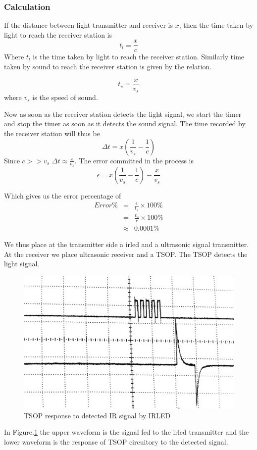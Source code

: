 \subsubsection{Calculation}
If the distance between light transmitter and receiver is $x$, then the time taken by light to reach the receiver station is 
\begin{equation}
	t_l = \frac{x}{c}
\end{equation}
Where $t_l$ is the time taken by light to reach the receiver station. Similarly time taken by sound to reach the receiver station is given by the relation.

\begin{equation}
	t_s = \frac{x}{v_s}
\end{equation}
where $v_s$ is the speed of sound.

Now as soon as the receiver station detects the light signal, we start the timer and stop the timer as soon as it detects the sound signal.
The time recorded by the receiver station will thus be 
\begin{equation} \label{eq:deltaT}
	\Delta t = x\left( \frac{1}{v_s}- \frac{1}{c}\right)
\end{equation}
Since $c >> v_s$ $\Delta t \approx \frac{x}{v_s}$. 
The error committed in the process is 
\begin{equation} 
	\epsilon = x\left( \frac{1}{v_s}- \frac{1}{c}\right) - \frac{x}{v_s}
\end{equation}

Which gives us the error percentage of 
\begin{eqnarray*}
	Error \% & =& \frac{\epsilon}{t_s}\times 100\%\\
	{}& = & \frac{v_s}{c} \times 100 \%\\
	{}& \approx & 0.0001\% 
\end{eqnarray*}

We thus place at the transmitter side a \gls{irled} and a ultrasonic signal transmitter. At the receiver we place ultrasonic receiver and a TSOP. The TSOP detects the light signal.

\begin{figure}
	\centering
	\includegraphics[width=120mm]{Images/DetectionByTSOP.jpg}
	\caption{TSOP response to detected IR signal by IRLED}
	\label{fig:DetectionByTSOP}
\end{figure} 
In Figure.\ref{fig:DetectionByTSOP} the upper waveform is the signal fed to the \gls{irled} transmitter and the lower waveform is the response of TSOP circuitory to the detected signal.

